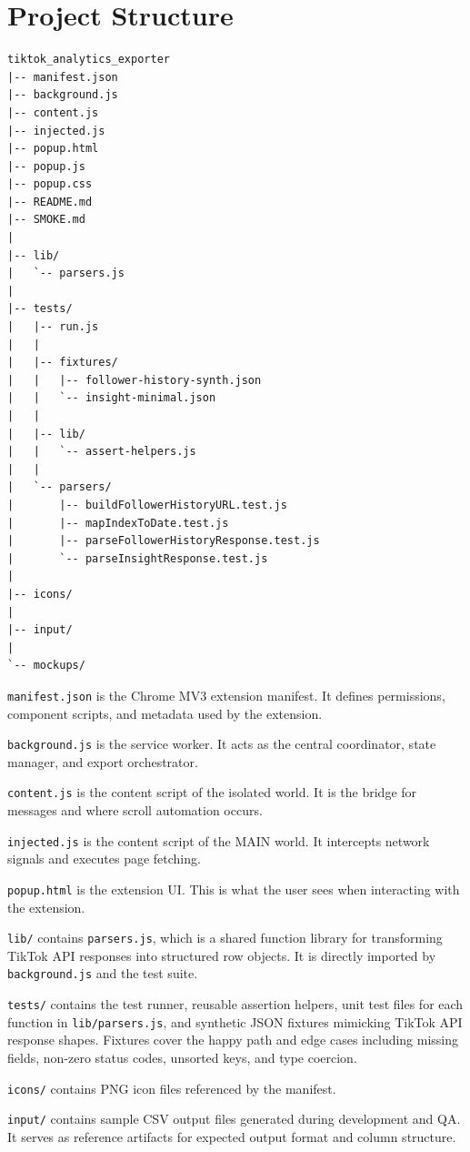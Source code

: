 \section{Project Structure}

\begin{verbatim}
tiktok_analytics_exporter
|-- manifest.json
|-- background.js
|-- content.js
|-- injected.js
|-- popup.html
|-- popup.js
|-- popup.css
|-- README.md
|-- SMOKE.md
|
|-- lib/
|   `-- parsers.js
|
|-- tests/
|   |-- run.js
|   |
|   |-- fixtures/
|   |   |-- follower-history-synth.json
|   |   `-- insight-minimal.json
|   |
|   |-- lib/
|   |   `-- assert-helpers.js
|   |
|   `-- parsers/
|       |-- buildFollowerHistoryURL.test.js
|       |-- mapIndexToDate.test.js
|       |-- parseFollowerHistoryResponse.test.js
|       `-- parseInsightResponse.test.js
|
|-- icons/
|
|-- input/
|
`-- mockups/
\end{verbatim}

\texttt{manifest.json} is the Chrome MV3 extension manifest. It defines permissions, component scripts, and metadata used by the extension.

\texttt{background.js} is the service worker. It acts as the central coordinator, state manager, and export orchestrator.

\texttt{content.js} is the content script of the isolated world. It is the bridge for messages and where scroll automation occurs.

\texttt{injected.js} is the content script of the MAIN world. It intercepts network signals and executes page fetching.

\texttt{popup.html} is the extension UI. This is what the user sees when interacting with the extension.

\texttt{lib/} contains \texttt{parsers.js}, which is a shared function library for transforming TikTok API responses into structured row objects. It is directly imported by \texttt{background.js} and the test suite.

\texttt{tests/} contains the test runner, reusable assertion helpers, unit test files for each function in \texttt{lib/parsers.js}, and synthetic JSON fixtures mimicking TikTok API response shapes. Fixtures cover the happy path and edge cases including missing fields, non-zero status codes, unsorted keys, and type coercion.

\texttt{icons/} contains PNG icon files referenced by the manifest.

\texttt{input/} contains sample CSV output files generated during development and QA. It serves as reference artifacts for expected output format and column structure.

